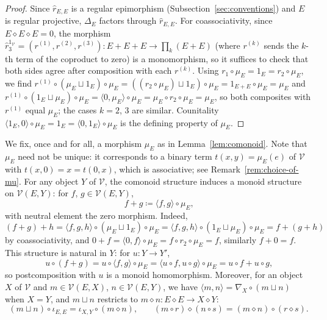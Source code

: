 \documentclass[reqno,a4paper]{amsart}
\theoremstyle{plain}
\theoremstyle{definition}
\newcommand{\DefEq}{\coloneq}
\newcommand{\V}{\ensuremath{\mathcal{V}}}
\newcommand{\cosmash}{\ensuremath{\diamond}}
\newcommand{\cosum}{\ensuremath{\sqcup}}                   %
\newcommand{\cm}[2]{\ensuremath{\hat{r}_{#1,#2}}}          %
\newcommand{\fold}[1]{\ensuremath{\nabla_{#1}}}            %
\newcommand{\diag}[1]{\ensuremath{\Delta_{#1}}}            %
\begin{document}
\begin{proof}
  Since \(\cm{E}{E}\) is a regular epimorphism (Subsection~\ref{sec:conventions}) and \(E\) is regular projective, \(\diag{E}\) factors through \(\cm{E}{E}\). For coassociativity, since \(E\cosmash E\cosmash E=0\), the morphism \(\hat{r}^{1_{\V}}_{3}=(r^{(1)},r^{(2)},r^{(3)})\colon E+E+E\to\prod_{k}(E+E)\) (where \(r^{(k)}\) sends the \(k\)-th term of the coproduct to zero) is a monomorphism, so it suffices to check that both sides agree after composition with each \(r^{(k)}\). Using \(r_{1}\circ\mu_{E}=1_{E}=r_{2}\circ\mu_{E}\), we find \(r^{(1)}\circ(\mu_{E}\cosum 1_{E})\circ\mu_{E}=((r_{2}\circ\mu_{E})\cosum 1_{E})\circ\mu_{E}=1_{E+E}\circ\mu_{E}=\mu_{E}\) and \(r^{(1)}\circ(1_{E}\cosum\mu_{E})\circ\mu_{E}=\langle 0,\mu_{E}\rangle\circ\mu_{E}=\mu_{E}\circ r_{2}\circ\mu_{E}=\mu_{E}\), so both composites with \(r^{(1)}\) equal \(\mu_{E}\); the cases \(k=2\), \(3\) are similar. Counitality \(\langle 1_{E},0\rangle\circ\mu_{E}=1_{E}=\langle 0,1_{E}\rangle\circ\mu_{E}\) is the defining property of \(\mu_{E}\).
\end{proof}

We fix, once and for all, a morphism \(\mu_{E}\) as in Lemma~\ref{lem:comonoid}. Note that \(\mu_{E}\) need not be unique: it corresponds to a binary term \(t(x,y)=\mu_{E}(e)\) of \(\V\) with \(t(x,0)=x=t(0,x)\), which is associative; see Remark~\ref{rem:choice-of-mu}. For any object \(Y\) of \(\V\), the comonoid structure induces a monoid structure on \(\V(E,Y)\): for \(f\), \(g\in\V(E,Y)\),
\begin{equation}\label{eq:def-sum}
  f+g\DefEq\langle f,g\rangle\circ\mu_{E}\text{,}
\end{equation}
with neutral element the zero morphism. Indeed,
\[
  (f+g)+h=\langle f,g,h\rangle\circ(\mu_{E}\cosum 1_{E})\circ\mu_{E}=\langle f,g,h\rangle\circ(1_{E}\cosum\mu_{E})\circ\mu_{E}=f+(g+h)
\]
by coassociativity, and \(0+f=\langle 0,f\rangle\circ\mu_{E}=f\circ r_{2}\circ\mu_{E}=f\), similarly \(f+0=f\). This structure is natural in \(Y\): for \(u\colon Y\to Y'\),
\begin{equation}\label{eq:post-additive}
  u\circ(f+g)=u\circ\langle f,g\rangle\circ\mu_{E}=\langle u\circ f,u\circ g\rangle\circ\mu_{E}=u\circ f+u\circ g\text{,}
\end{equation}
so postcomposition with \(u\) is a monoid homomorphism. Moreover, for an object \(X\) of \(\V\) and \(m\in\V(E,X)\), \(n\in\V(E,Y)\), we have \(\langle m,n\rangle=\fold{X}\circ(m\cosum n)\) when \(X=Y\), and \(m\cosum n\) restricts to \(m\cosmash n\colon E\cosmash E\to X\cosmash Y\):
\begin{equation}\label{eq:restriction}
  (m\cosum n)\circ\iota_{E,E}=\iota_{X,Y}\circ(m\cosmash n)\text{,}\qquad (m\circ r)\cosmash(n\circ s)=(m\cosmash n)\circ(r\cosmash s)\text{.}
\end{equation}
\end{document}
